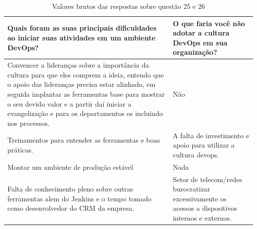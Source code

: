 \documentclass[twoside,english,brazilian]{UNISINOSartigo}
\begin{document}
\begin{table}[h]
\footnotesize
    \caption{Valores brutos das respostas sobre questão 25 e 26}
   \begin{tabularx}{\columnwidth}{XX}
    \hline
    \textbf{Quais foram as suas principais dificuldades ao iniciar suas atividades em um ambiente DevOps?}                                                                                                                                                                                                                                  & \textbf{O que faria você não adotar a cultura DevOps em sua organização?}                                                                                            \\ \hline
       Convencer   a lideranças sobre a importância da cultura para que eles comprem a ideia,   entendo que o apoio das lideranças precisa estar alinhado, em seguida   implantar as ferramentas base para mostrar o seu devido valor e a partir daí   iniciar a evangelização e para os departamentos os incluindo nos processos. &    Não                                                                                                                                                      \\ \hline
       Treinamentos   para entender as ferramentas e boas práticas.                                                                                                                                                                                                                                                                &    A falta   de investimento e apoio para utilizar a cultura devops.                                                                                        \\ \hline
    Montar um ambiente de produção estável                                                                                                                                                                                                                                                                                         &    Nada                                                                                                                                                     \\ \hline
       Falta de   conhecimento pleno sobre outras ferramentas alem do Jenkins e o tempo tomado   como desenvolvedor do CRM da empresa.                                                                                                                                                                                             &    Setor de   telecom/redes burocratizar excessivamente os acessos a dispositivos internos   e externos.                                                    \\ \hline

\end{tabularx}
\end{table}
\end{document}
